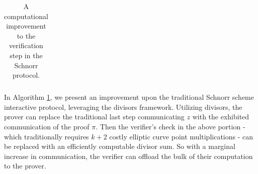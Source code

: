 \documentclass[11pt,letterpaper]{article}
\theoremstyle{definition}
\newcommand{\6}{\mathbf}
\newcommand{\7}{\mathcal}
\newcommand{\lsamp}{\xleftarrow{\$}}
\begin{document}
\begin{table}[H]
\begin{tabular}{|lcl|}






    \hline
    \end{tabular}    
    \caption{A computational improvement to the verification step in the Schnorr protocol.}
    \label{alg:SchnorrDivisors}
\end{table}








In Algorithm \ref{alg:SchnorrDivisors}, we present an improvement upon the traditional Schnorr scheme interactive protocol, leveraging the divisors framework. 
Utilizing divisors, the prover can replace the traditional last step communicating $z$ with the exhibited communication of the proof $\pi$.
Then the verifier's check in the above portion - which traditionally requires $k+2$ costly elliptic curve point multiplications - can be replaced with an efficiently computable divisor sum. 
So with a marginal increase in communication, the verifier can offload the bulk of their computation to the prover.
\end{document}
